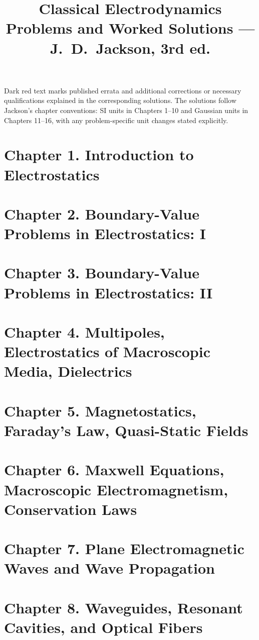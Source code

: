 \documentclass[11pt]{article}
\title{\textbf{Classical Electrodynamics}\\[4pt]
\large Problems and Worked Solutions --- J.~D.~Jackson, 3rd ed.}
\author{}
\date{}
\begin{document}
\maketitle
\noindent\small Dark red text marks published errata and additional
corrections or necessary qualifications explained in the corresponding
solutions. The solutions follow Jackson's chapter conventions: SI units
in Chapters 1--10 and Gaussian units in Chapters 11--16, with any
problem-specific unit changes stated explicitly.\normalsize\par\medskip
\tableofcontents
\clearpage

\section{Chapter 1. Introduction to Electrostatics}

\clearpage
\section{Chapter 2. Boundary-Value Problems in Electrostatics: I}

\clearpage
\section{Chapter 3. Boundary-Value Problems in Electrostatics: II}

\clearpage
\section{Chapter 4. Multipoles, Electrostatics of Macroscopic Media, Dielectrics}

\clearpage
\section{Chapter 5. Magnetostatics, Faraday's Law, Quasi-Static Fields}

\clearpage
\section{Chapter 6. Maxwell Equations, Macroscopic Electromagnetism, Conservation Laws}

\clearpage
\section{Chapter 7. Plane Electromagnetic Waves and Wave Propagation}

\clearpage
\section{Chapter 8. Waveguides, Resonant Cavities, and Optical Fibers}

\clearpage
\end{document}
